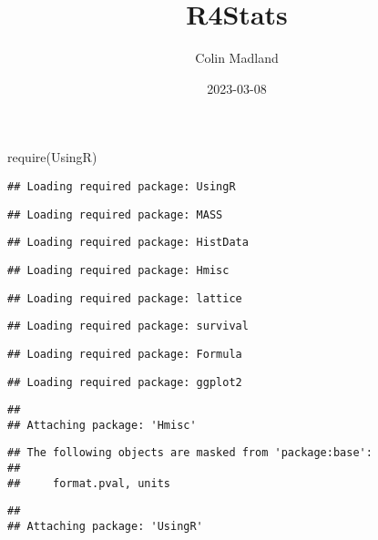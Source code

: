 \documentclass[
]{book}
\title{R4Stats}
\author{Colin Madland}
\date{2023-03-08}
\newenvironment{Shaded}{\begin{snugshade}}{\end{snugshade}}
\newcommand{\FunctionTok}[1]{\textcolor[rgb]{0.00,0.00,0.00}{#1}}
\newcommand{\NormalTok}[1]{#1}
\theoremstyle{definition}
\theoremstyle{definition}
\theoremstyle{definition}
\theoremstyle{definition}
\theoremstyle{remark}
\begin{document}
\maketitle

{
\setcounter{tocdepth}{1}
\tableofcontents
}
\begin{Shaded}
\begin{Highlighting}[]
\FunctionTok{require}\NormalTok{(UsingR)}
\end{Highlighting}
\end{Shaded}

\begin{verbatim}
## Loading required package: UsingR
\end{verbatim}

\begin{verbatim}
## Loading required package: MASS
\end{verbatim}

\begin{verbatim}
## Loading required package: HistData
\end{verbatim}

\begin{verbatim}
## Loading required package: Hmisc
\end{verbatim}

\begin{verbatim}
## Loading required package: lattice
\end{verbatim}

\begin{verbatim}
## Loading required package: survival
\end{verbatim}

\begin{verbatim}
## Loading required package: Formula
\end{verbatim}

\begin{verbatim}
## Loading required package: ggplot2
\end{verbatim}

\begin{verbatim}
## 
## Attaching package: 'Hmisc'
\end{verbatim}

\begin{verbatim}
## The following objects are masked from 'package:base':
## 
##     format.pval, units
\end{verbatim}

\begin{verbatim}
## 
## Attaching package: 'UsingR'
\end{verbatim}
\end{document}
